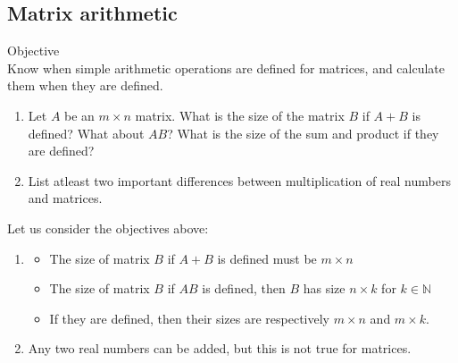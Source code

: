 \documentclass[journal, letterpaper]{IEEEtran}
\begin{document}
    \subsection{Matrix arithmetic}
    \begin{mybox}{Objective} \\ 
        Know when simple arithmetic operations are defined 
        for matrices, and calculate them when they are defined.
        \begin{enumerate}
            \item Let $A$ be an $m\times n$ matrix. What is the size of the matrix $B$ if $A + B$ is defined? What about $AB$? What is the size of the sum and product if they are defined?
            \item List atleast two important differences between multiplication of real numbers and matrices.
        \end{enumerate}
    \end{mybox}
    Let us consider the objectives above:
    \begin{enumerate}
        \item \begin{itemize}
            \item The size of matrix $B$ if $A + B$ is defined must be $m \times n$
            \item The size of matrix $B$ if $AB$ is defined, then $B$ has size $n \times k$ for $k \in \mathbb{N}$
            \item If they are defined, then their sizes are respectively $m \times n$ and $m \times k$.
        \end{itemize}
        \item Any two real numbers can be added, but this is not true for matrices.
    \end{enumerate}
\end{document}
